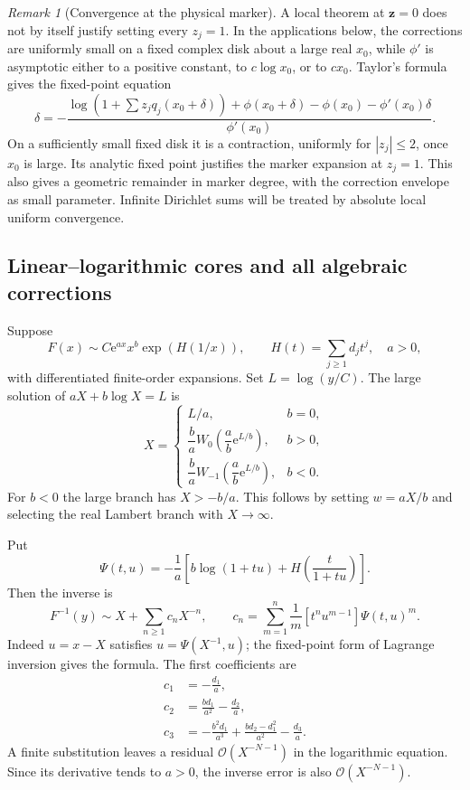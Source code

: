 \documentclass[11pt,a4paper]{article}
\theoremstyle{definition}
\theoremstyle{remark}
\newtheorem{remark}[theorem]{Remark}
\newcommand{\ee}{\mathrm e}
\newcommand{\OO}{\mathcal O}
\newcommand{\coef}[1]{\left[#1\right]}
\numberwithin{equation}{section}
\begin{document}
\begin{remark}[Convergence at the physical marker]
A local theorem at $\bm z=0$ does not by itself justify setting every $z_j=1$. In the applications below, the corrections are uniformly small on a fixed complex disk about a large real $x_0$, while $\phi'$ is asymptotic either to a positive constant, to $c\log x_0$, or to $cx_0$. Taylor's formula gives the fixed-point equation
\[
 \delta=-\frac{\log(1+\sum z_jq_j(x_0+\delta))
 +\phi(x_0+\delta)-\phi(x_0)-\phi'(x_0)\delta}{\phi'(x_0)}.
\]
On a sufficiently small fixed disk it is a contraction, uniformly for $|z_j|\le2$, once $x_0$ is large. Its analytic fixed point justifies the marker expansion at $z_j=1$. This also gives a geometric remainder in marker degree, with the correction envelope as small parameter. Infinite Dirichlet sums will be treated by absolute local uniform convergence.
\end{remark}

\subsection{Linear--logarithmic cores and all algebraic corrections}
Suppose
\begin{equation}
 F(x)\sim C\ee^{ax}x^b
 \exp\!\left(H(1/x)\right),\qquad
 H(t)=\sum_{j\ge1}d_jt^j,
 \quad a>0,
 \label{eq:linlogmodel}
\end{equation}
with differentiated finite-order expansions. Set $L=\log(y/C)$. The large solution of $aX+b\log X=L$ is
\begin{equation}
 X=
 \begin{cases}
 L/a,&b=0,\\[2pt]
 \dfrac ba W_0\!\left(\dfrac ab\ee^{L/b}\right),&b>0,\\[6pt]
 \dfrac ba W_{-1}\!\left(\dfrac ab\ee^{L/b}\right),&b<0.
 \end{cases}
 \label{eq:linlogcore}
\end{equation}
For $b<0$ the large branch has $X>-b/a$. This follows by setting $w=aX/b$ and selecting the real Lambert branch with $X\to\infty$.

Put
\begin{equation}
 \Psi(t,u)=-\frac1a\left[b\log(1+tu)+
 H\!\left(\frac{t}{1+tu}\right)\right].
 \label{eq:psi}
\end{equation}
Then the inverse is
\begin{equation}
 F^{-1}(y)\sim X+\sum_{n\ge1}c_nX^{-n},\qquad
 c_n=\sum_{m=1}^n\frac1m\coef{t^nu^{m-1}}\Psi(t,u)^m.
 \label{eq:linlogcoeff}
\end{equation}
Indeed $u=x-X$ satisfies $u=\Psi(X^{-1},u)$; the fixed-point form of Lagrange inversion gives the formula. The first coefficients are
\begin{align}
 c_1&=-\frac{d_1}{a},\nonumber\\
 c_2&=\frac{bd_1}{a^2}-\frac{d_2}{a},\label{eq:c123}\\
 c_3&=-\frac{b^2d_1}{a^3}+\frac{bd_2-d_1^2}{a^2}-\frac{d_3}{a}.\nonumber
\end{align}
A finite substitution leaves a residual $\OO(X^{-N-1})$ in the logarithmic equation. Since its derivative tends to $a>0$, the inverse error is also $\OO(X^{-N-1})$.
\end{document}

